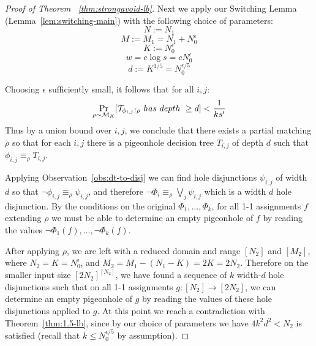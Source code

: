 \begin{proof}[Proof of Theorem ~\ref{thm:strongavoid-lb}]
Next we apply our Switching Lemma (Lemma~\ref{lem:switching-main}) with the following choice of parameters:
$$N:= N_1$$
$$M:=M_1 = N_1 + N_0^{\epsilon}$$
$$K:=N_0^{\epsilon}$$
$$w = c \log s = c N_0^{\epsilon}$$
$$d:=K^{1/5} = N_0^{\epsilon/5} $$



Choosing $\epsilon$ sufficiently small, it follows that for all $i,j$:
$$\Pr_{\rho \sim {\cal M}_K}[{\cal T}_{\phi_{i,j}\upharpoonright\rho}~ has ~depth~\geq d] < \frac{1}{ks'}$$ 
Thus by a union bound over $i,j$, we conclude that
there exists a partial matching $\rho$ 
so that for each $i,j$ there is a pigeonhole decision tree $T_{i,j}$ of depth $d$
such that $\phi_{i,j} \equiv_{\rho} T_{i,j}$.

Applying Observation~\ref{obs:dt-to-disj} we can find hole disjunctions $\psi_{i,j}$ of width $d$ so that $\lnot \phi_{i,j} \equiv_{\rho} \psi_{i,j}$, and therefore $\lnot \Phi_i \equiv_{\rho} \bigvee_j \psi_{i,j}$ which is a width $d$ hole disjunction. By the conditions on the original $\Phi_1,\ldots,\Phi_k$, for all 1-1 assignments $f$ extending $\rho$ we must be able to determine an empty pigeonhole of $f$ by reading the values $\lnot \Phi_1(f),\ldots,\lnot \Phi_k(f)$. 

After applying $\rho$, we are left with a reduced domain and range $[N_2]$ and $[M_2]$, where $N_2 = K = N_0^{\epsilon}$, and $M_2 = M_1 - (N_1 - K) = 2K = 2N_2$.
Therefore on the smaller input size $[2N_2]^{[N_2]}$, we have found a sequence of $k$ width-$d$ hole disjunctions such that on all 1-1 assignments $g: [N_2] \to [2 N_2]$, we can determine an empty pigeonhole of $g$ by reading the values of these hole disjunctions applied to $g$. At this point we reach a contradiction with Theorem~\ref{thm:1.5-lb}, since by our choice of parameters we have $4k^2d^2 < N_2$ is satisfied (recall that $k \leq N_0^{\epsilon/5}$ by assumption).%
 

\end{proof}


